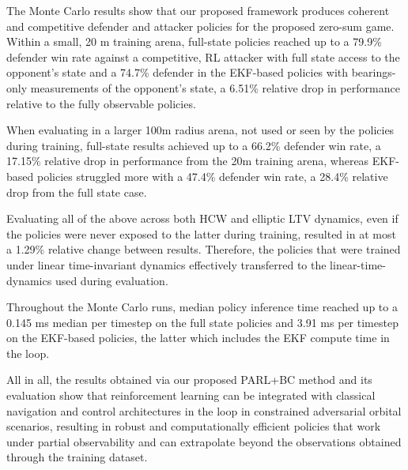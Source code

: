 The Monte Carlo results show that our proposed framework produces coherent and competitive defender and attacker policies for the proposed zero-sum game. Within a small, 20 m training arena, full-state policies reached up to a 79.9\% defender win rate against a competitive, RL attacker with full state access to the opponent's state and a 74.7\% defender in the EKF-based policies with bearings-only measurements of the opponent's state, a 6.51\% relative drop in performance relative to the fully observable policies.

When evaluating in a larger 100m radius arena, not used or seen by the policies during training, full-state results achieved up to a 66.2\% defender win rate, a 17.15\% relative drop in performance from the 20m training arena, whereas EKF-based policies struggled more with a 47.4\% defender win rate, a 28.4\% relative drop from the full state case. 

Evaluating all of the above across both HCW and elliptic LTV dynamics, even if the policies were never exposed to the latter during training, resulted in at most a 1.29\% relative change between results. Therefore, the policies that were trained under linear time-invariant dynamics effectively transferred to the linear-time-dynamics used during evaluation.

Throughout the Monte Carlo runs, median policy inference time reached up to a 0.145 ms median per timestep on the full state policies and 3.91 ms per timestep on the EKF-based policies, the latter which includes the EKF compute time in the loop.

All in all, the results obtained via our proposed PARL+BC method and its evaluation show that reinforcement learning can be integrated with classical navigation and control architectures in the loop in constrained adversarial orbital scenarios, resulting in robust and computationally efficient policies that work under partial observability and can extrapolate beyond the observations obtained through the training dataset.